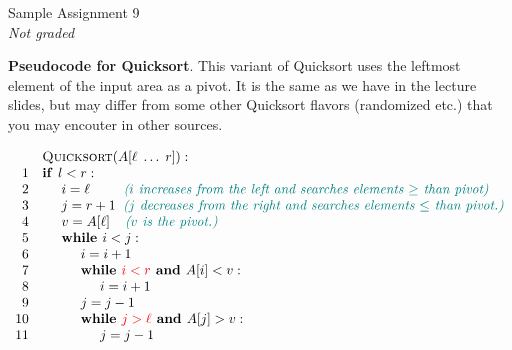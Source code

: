 \documentclass[a4paper,12pt]{article}
\begin{document}

\thispagestyle{empty}

\begin{center}
{\Large Sample Assignment 9}\\
{\em Not graded} 
\end{center}

\noindent


\vspace{10pt}
{\bf Pseudocode for Quicksort}. This variant of Quicksort
uses the leftmost element of the input area as a pivot. 
It is the same as
we have in the lecture slides, but may differ from 
some other Quicksort flavors (randomized etc.) that you may encouter
in other sources.

\[
\begin{array}{rl}
 & \text{\textsc{Quicksort}}(A[\ell\;\ldots\;r]):\\
1 & \text{\textbf{if\ }} l<r:\\
2 & \hspace{.5cm} i = \ell \;\;\;\;\;\;\;\;\; \textcolor{teal}{\text{\em ($i$ increases from the left and searches elements $\geq$ than pivot)}}\\
3 & \hspace{.5cm} j = r+1	\;\; \textcolor{teal}{\text{\em ($j$ decreases from the right and searches elements $\leq$ than pivot.)}}\\	
4 & \hspace{.5cm} v = A[\ell] \;\;\;\; \textcolor{teal}{\text{\em ($v$ is the pivot.)}}\\
5 & \hspace{.5cm} \text{\textbf{while\ }} i<j:\\
6 & \hspace{1.0cm} i = i+1\\
7 & \hspace{1.0cm} \text{\textbf{while\ }} \textcolor{red}{i<r} \text{\textbf{\ and\ }} A[i]<v:\\
8 & \hspace{1.5cm} i = i+1\\
9 & \hspace{1.0cm} j = j-1\\
10 & \hspace{1.0cm} \text{\textbf{while\ }} \textcolor{red}{j>\ell} \text{\textbf{\ and\ }} A[j]>v:\\
11 & \hspace{1.5cm} j = j-1\\

\end{array}\]
\end{document}
